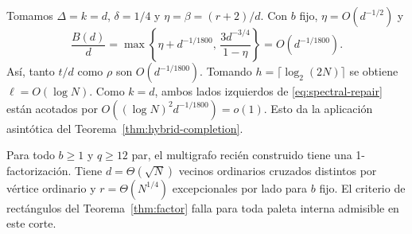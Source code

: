 Tomamos \(\Delta=k=d\), \(\delta=1/4\) y \(\eta=\beta=(r+2)/d\). Con \(b\) fijo, \(\eta=O(d^{-1/2})\) y
\[
 \frac{B(d)}{d}
 =\max\left\{\eta+d^{-1/1800},\,\frac{3d^{-3/4}}{1-\eta}\right\}
 =O(d^{-1/1800}).
\]
Así, tanto \(t/d\) como \(\rho\) son \(O(d^{-1/1800})\). Tomando \(h=\lceil\log_2(2N)\rceil\) se obtiene \(\ell=O(\log N)\). Como \(k=d\), ambos lados izquierdos de \eqref{eq:spectral-repair} están acotados por \(O((\log N)^2d^{-1/1800})=o(1)\). Esto da la aplicación asintótica del Teorema~\ref{thm:hybrid-completion}.

\begin{corollary}\label{cor:sparse-grid}
Para todo \(b\ge1\) y \(q\ge12\) par, el multigrafo recién construido tiene una 1-factorización. Tiene \(d=\Theta(\sqrt N)\) vecinos ordinarios cruzados distintos por vértice ordinario y \(r=\Theta(N^{1/4})\) excepcionales por lado para \(b\) fijo. El criterio de rectángulos del Teorema~\ref{thm:factor} falla para toda paleta interna admisible en este corte.
\end{corollary}

